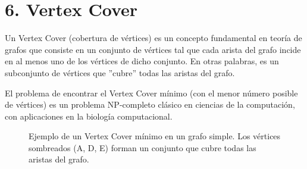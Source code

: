 \documentclass[11pt,a4paper]{article}
\begin{document}
  \section*{6. Vertex Cover}
  
  \noindent Un Vertex Cover (cobertura de vértices) es un concepto fundamental en teoría de grafos que consiste en un conjunto de vértices tal que cada arista del grafo incide en al menos uno de los vértices de dicho conjunto. En otras palabras, es un subconjunto de vértices que ''cubre'' todas las aristas del grafo.
  
  \noindent El problema de encontrar el Vertex Cover mínimo (con el menor número posible de vértices) es un problema NP-completo clásico en ciencias de la computación, con aplicaciones en la biología computacional.
  
  \begin{figure}[H]
    \centering
    \caption{Ejemplo de un Vertex Cover mínimo en un grafo simple. Los vértices sombreados (A, D, E) forman un conjunto que cubre todas las aristas del grafo.}
    \label{fig:vertex_cover}
  \end{figure}
  
\end{document}
